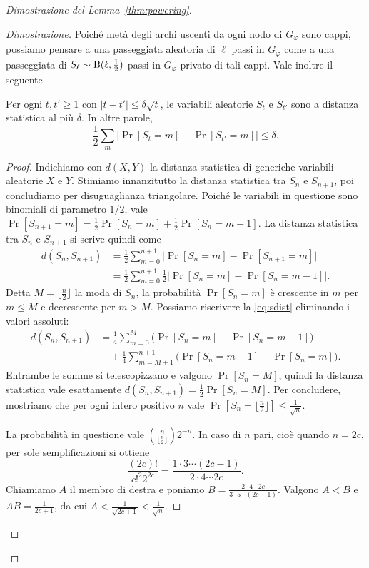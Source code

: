 \begin{proof}[Dimostrazione del Lemma~\ref{thm:powering}]
\begin{proof}[Dimostrazione]
		Poiché metà degli archi uscenti da ogni nodo di $G_\varphi$ sono cappi,
		possiamo pensare a una passeggiata aleatoria di $\ell$ passi in $G_\varphi$
		come a una passeggiata di $S_\ell\sim\operatorname{B}(\ell, \frac12)$ passi in $G_\varphi$
		privato di tali cappi.
		Vale inoltre il seguente
		\begin{lemma}
			Per ogni $t, t' \ge 1$ con $|t - t'| \le \delta \sqrt{t}$, le variabili
			aleatorie $S_t$ e $S_{t'}$ sono a distanza statistica al più $\delta$.
			In altre parole,
			\[
				\frac12 \sum_{m}{ \bigl| \Pr[S_t = m] - \Pr[S_{t'} = m] \bigr| }
				\le \delta.
			\]
		\end{lemma}
		\begin{proof}
			Indichiamo con $d(X, Y)$ la distanza statistica di generiche variabili
			aleatorie $X$ e $Y$.
			Stimiamo innanzitutto la distanza statistica tra $S_n$ e $S_{n + 1}$, poi
			concludiamo per disuguaglianza triangolare.
			Poiché le variabili in questione sono binomiali di parametro $1/2$, vale
			$\Pr[S_{n + 1} = m] = \frac12 \Pr[S_n = m] + \frac12 \Pr[S_n = m - 1]$.
			La distanza statistica tra $S_n$ e $S_{n + 1}$ si scrive quindi come
			\begin{equation} \label{eq:sdist}
			\begin{aligned}
				d(S_n, S_{n + 1}) &= \frac12 \sum_{m = 0}^{n + 1}
					\bigl| \Pr[S_n = m] - \Pr[S_{n + 1} = m] \bigr| \\
				&= \frac12 \sum_{m = 0}^{n + 1}
					\frac12 \bigl| \Pr[S_n = m] - \Pr[S_n = m - 1] \bigr|.
			\end{aligned}
			\end{equation}
			Detta $M = \lfloor \frac{n}{2} \rfloor$ la moda di $S_n$, la probabilità
			$\Pr[S_n = m]$ è crescente in $m$ per $m \le M$ e decrescente
			per $m > M$.
			Possiamo riscrivere la \eqref{eq:sdist} eliminando i valori assoluti:
			\begin{align*}
				d(S_n, S_{n + 1}) &=
				\frac14 \sum_{m = 0}^{M}
					\bigl(\Pr[S_n = m] - \Pr[S_n = m - 1]\bigr) \\
				&\quad + \frac14 \sum_{m = M + 1}^{n + 1}
					\bigl(\Pr[S_n = m - 1] - \Pr[S_n = m]\bigr).
			\end{align*}
			Entrambe le somme si telescopizzano e valgono $\Pr[S_n = M]$, quindi la
			distanza statistica vale esattamente
			$d(S_n, S_{n + 1}) = \frac12 \Pr[S_n = M]$.
			Per concludere, mostriamo che per ogni intero positivo $n$ vale
			$\Pr[S_n = \lfloor \frac{n}{2} \rfloor] \le \frac1{\sqrt{n}}$.

			La probabilità in questione vale
			$\binom{n}{\lfloor \frac{n}{2} \rfloor} 2^{-n}$.
			In caso di $n$ pari, cioè quando $n = 2c$, per sole
			semplificazioni si ottiene
			\[
				\frac{(2c)!}{c!^2 2^{2c}} = \frac{1 \cdot 3 \cdots
				(2c - 1)}{2 \cdot 4 \cdots 2c}.
			\]
			Chiamiamo $A$ il membro di destra e poniamo $B = \frac{2 \cdot 4
			\cdots 2c}{3 \cdot 5 \cdots (2c + 1)}$. Valgono $A < B$ e
			$A B = \frac1{2c + 1}$, da cui
			$A < \frac1{\sqrt{2c + 1}} < \frac1{\sqrt n}$.


\end{proof}
\end{proof}
\end{proof}
